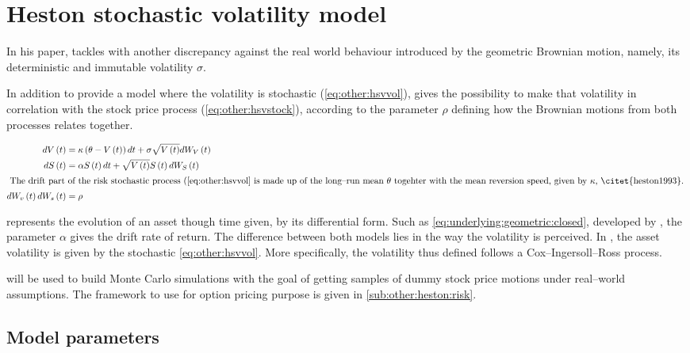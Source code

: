 \documentclass[12pt]{report}
\newcommand{\Bmsub}[1]{W_{#1}\left(t\right)}
\newcommand{\St}{S\left(t\right)}
\newcommand{\Vt}{V\left(t\right)}
\newcommand{\HSVstock}{
  d\St &= \alpha \St dt + \sqrt{\Vt} \St d \Bmsub{S}
}
\newcommand{\HSVvol}{
  d\Vt &= \kappa\left(\theta - \Vt \right) dt + \sigma \sqrt{\Vt} d \Bmsub{V}
}
\begin{document}
\section{Heston stochastic volatility model}
\label{sec:other:heston}

In his paper, \citet{heston1993} tackles with another discrepancy against the real world behaviour introduced by the geometric Brownian motion, namely, its deterministic and immutable volatility $\sigma$.

In addition to provide a model where the volatility is stochastic (\cref{eq:other:hsvvol}), \citet{heston1993} gives the possibility to make that volatility in correlation with the stock price process (\cref{eq:other:hsvstock}), according to the parameter $\rho$ defining how the Brownian motions from both processes relates together.

\begin{align}
    \HSVvol \label{eq:other:hsvvol} \\
    \HSVstock \label{eq:other:hsvstock} \\
    \intertext{
    The drift part of the risk stochastic process (\ref{eq:other:hsvvol} is made up of the long--run mean $\theta$ togehter with the mean reversion speed, given by $\kappa$, \citet{heston1993}.
    }
    d\Bmsub{v} d\Bmsub{s} &= \rho \label{eq:other:rho}
\end{align}

 represents the evolution of an asset though time given, by its differential form. Such as \cref{eq:underlying:geometric:closed}, developed by \citet{bs}, the parameter $\alpha$ gives the drift rate of return. The difference between both models lies in the way the volatility is perceived. In \citet{heston1993}, the asset volatility is given by the stochastic \cref{eq:other:hsvvol}. More specifically, the volatility thus defined follows a Cox--Ingersoll--Ross process.

 will be used to build Monte Carlo simulations with the goal of getting samples of dummy stock price motions under real--world assumptions. The framework to use for option pricing purpose is given in \cref{sub:other:heston:risk}.

\subsection{Model parameters}
\label{sub:other:heston:model}
\end{document}

